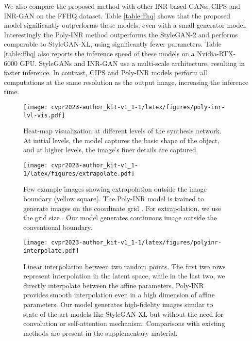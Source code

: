 We also compare the proposed method with other INR-based GANs: CIPS and INR-GAN on the FFHQ dataset. Table \ref{table:ffhq} shows that the proposed model significantly outperforms these models, even with a small generator model. Interestingly the Poly-INR method outperforms the StyleGAN-2 and performs comparable to StyleGAN-XL, using significantly fewer parameters. Table \ref{table:ffhq} also reports the inference speed of these models on a Nvidia-RTX-6000 GPU. StyleGANs and INR-GAN use a multi-scale architecture, resulting in faster inference. In contrast, CIPS and Poly-INR models perform all computations at the same resolution as the output image, increasing the inference time. 
\begin{figure}[]
     \centering
\texttt{[image: cvpr2023-author\_kit-v1\_1-1/latex/figures/poly-inr-lvl-vis.pdf]}
\caption{Heat-map visualization at different levels of the synthesis network. At initial levels, the model captures the basic shape of the object, and at higher levels, the image's finer details are captured.}
        \label{fig:heatmap}
\end{figure}

\begin{figure}[]
     \centering
\texttt{[image: cvpr2023-author\_kit-v1\_1-1/latex/figures/extrapolate.pdf]}
\caption{Few example images showing extrapolation outside the image boundary (yellow square). The Poly-INR model is trained to generate images on the coordinate grid . For extrapolation, we use the grid size . Our model generates continuous image outside the conventional boundary.}
        \label{fig:extrapolation}
\end{figure}


\begin{figure*}[]
     \centering
     \vspace{-0.2in}
         \texttt{[image: cvpr2023-author\_kit-v1\_1-1/latex/figures/polyinr-interpolate.pdf]}
        \vspace{-0.1in}
        \caption{Linear interpolation between two random points. The first two rows represent interpolation in the latent space, while in the last two, we directly interpolate between the affine parameters. Poly-INR provides smooth interpolation even in a high dimension of affine parameters. Our model generates high-fidelity images similar to state-of-the-art models like StyleGAN-XL but without the need for convolution or self-attention mechanism. Comparisons with existing methods are present in the supplementary material. }
        \label{fig:interpolation}
\end{figure*}

